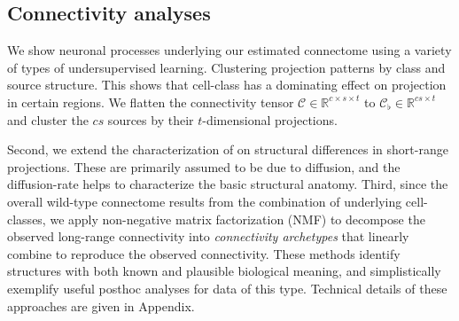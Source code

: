 

\newpage
\subsection{Connectivity analyses}

We show neuronal processes underlying our estimated connectome using a variety of types of undersupervised learning.
Clustering projection patterns by class and source structure.
This shows that cell-class has a dominating effect on projection in certain regions.
We flatten the connectivity tensor $\mathcal C \in \mathbb R^{c \times s \times t}$ to $\mathcal C_\flat \in \mathbb R^{c s \times t}$ and cluster the $cs$ sources by their $t$-dimensional projections.

Second, we extend the characterization of \citet{Knox2019-ot} on structural differences in short-range projections.
These are primarily assumed to be due to diffusion, and the diffusion-rate helps to characterize the basic structural anatomy.
Third, since the overall wild-type connectome results from the combination of underlying cell-classes, we apply non-negative matrix factorization (NMF) to decompose the observed long-range connectivity into \textit{connectivity archetypes} that linearly combine to reproduce the observed connectivity.
These methods identify structures with both known and plausible biological meaning, and simplistically exemplify useful posthoc analyses for data of this type.
Technical details of these approaches are given in Appendix.

